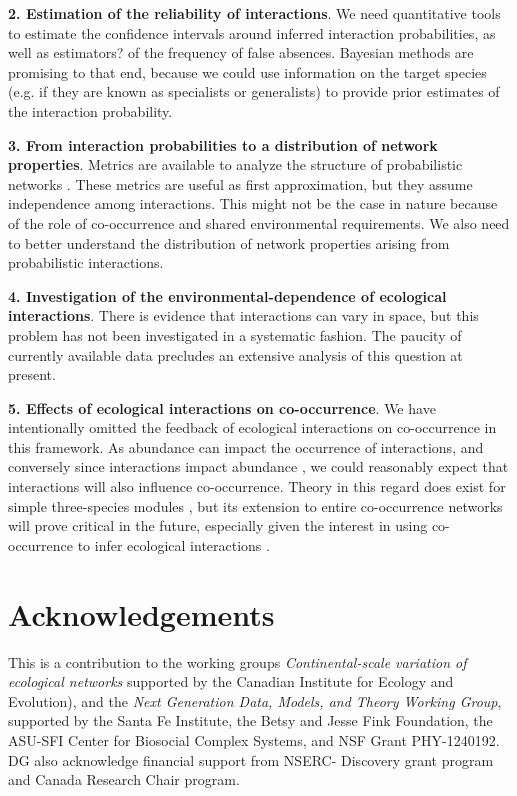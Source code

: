 \documentclass[12pt]{article}
\begin{document}
\textbf{2. Estimation of the reliability of interactions}. We need
quantitative tools to estimate the confidence intervals around inferred
interaction probabilities, as well as estimators? of the frequency of false
absences. Bayesian methods are promising to that end, because we could use
information on the target species (e.g. if they are known as specialists or
generalists) to provide prior estimates of the interaction probability.

\textbf{3. From interaction probabilities to a distribution of network properties}.
Metrics are available to analyze the structure of probabilistic networks
\citep{Poisot2015c}. These metrics are useful as first approximation, but they
assume independence among interactions. This might not be the case in nature
because of the role of co-occurrence and shared environmental requirements. We
also need to better understand the distribution of network properties arising
from probabilistic interactions.

\textbf{4. Investigation of the environmental-dependence of ecological interactions}.
There is evidence that interactions can vary in space, but this problem has
not been investigated in a systematic fashion. The paucity of currently available data
precludes an extensive analysis of this question at present.

\textbf{5. Effects of ecological interactions on co-occurrence}. We have
intentionally omitted the feedback of ecological interactions on co-occurrence
in this framework. As abundance can impact the occurrence of interactions, and
conversely since interactions impact abundance \citep{Canard2014}, we could
reasonably expect that interactions will also influence co-occurrence. Theory
in this regard does exist for simple three-species modules
\citep{Cazelles2015}, but its extension to entire co-occurrence networks will
prove critical in the future, especially given the interest in using co-
occurrence to infer ecological interactions \citep{Morales2015, Morueta-
Holme2016}.

\section*{Acknowledgements} 

This is a contribution to the working groups \emph {Continental-scale
variation of ecological networks} supported by the Canadian Institute for
Ecology and Evolution), and the \emph{ Next Generation Data, Models, and
Theory Working Group}, supported by the Santa Fe Institute, the Betsy and
Jesse Fink Foundation, the ASU-SFI Center for Biosocial Complex Systems, and
NSF Grant PHY-1240192. DG also acknowledge financial support from NSERC-
Discovery grant program and Canada Research Chair program.
\end{document}
